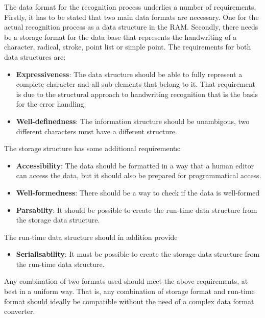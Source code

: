 The data format for the recognition process underlies a number of requirements.
Firstly, it has to be stated that two main data formats are necessary. 
One for the actual recognition process as a data structure in the RAM.
Secondly, there needs be a storage format for the data base that represents
the handwriting of a character, radical, stroke, point list or simple point.
The requirements for both data structures are:
\begin{itemize}
  \item \textbf{Expressiveness}: The data structure should be able to 
        fully represent a complete character and all sub-elements that belong 
        to it. That requirement is due to the structural approach to handwriting
        recognition that is the basis for the error handling.

  \item \textbf{Well-definedness}: The information structure should be 
        unambigous, two different characters must have a different structure.
\end{itemize}
The storage structure has some additional requirements:
\begin{itemize}
  \item \textbf{Accessibility}: The data should be formatted in a way that a 
        human editor can access the data, but it should also be prepared for 
        programmatical access.
  \item \textbf{Well-formedness}: There should be a way to check if the data is 
        well-formed
  \item \textbf{Parsabilty}: It should be possible to create the run-time data 
        structure from the storage data structure.
\end{itemize}
The run-time data structure should in addition provide
\begin{itemize}
  \item \textbf{Serialisability}: It must be possible to create the storage 
        data structure from the run-time data structure.
\end{itemize}
Any combination of two formats used should meet the above requirements, 
at best in a uniform way. That is, any combination of storage format and 
run-time format should ideally be compatible without the need of a complex
data format converter.



